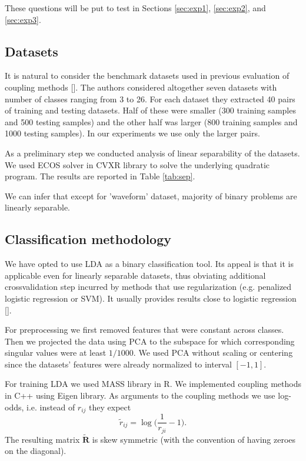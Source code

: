 \documentclass[twoside,11pt]{article}
\begin{document}
These questions will be put to test in Sections \ref{sec:exp1}, \ref{sec:exp2}, and \ref{sec:exp3}.

\subsection{Datasets}

It is natural to consider the benchmark datasets used in previous evaluation of coupling methods [\cite{wu2004probability}]. The authors considered altogether seven datasets with number of classes ranging from 3 to 26. For each dataset they extracted 40 pairs of training and testing datasets. Half of these were smaller (300 training samples and 500 testing samples) and the other half was larger (800 training samples and 1000 testing samples). In our experiments we use only the larger pairs. 

As a preliminary step we conducted analysis of linear separability of the datasets. We used ECOS solver in CVXR library to solve the underlying quadratic program. The results are reported in Table \ref{tab:sep}.



We can infer that except for 'waveform' dataset, majority of binary problems are linearly separable.

\subsection{Classification methodology}

We have opted to use LDA as a binary classification tool. Its appeal is that it is applicable even for linearly separable datasets, thus obviating additional crossvalidation step incurred by methods that use regularization (e.g. penalized logistic regression or SVM). It usually provides results close to logistic regression [\cite{james2013introduction}].

For preprocessing we first removed features that were constant across classes. Then we projected the data using PCA to the subspace for which corresponding singular values were at least $1/1000$. We used PCA without scaling or centering since the datasets' features were already normalized to interval $[-1,1]$. 

For training LDA we used MASS library in R. We implemented coupling methods in C++ using Eigen library. As arguments to the coupling methods we use log-odds, i.e. instead of $r_{ij}$ they expect
$$
\tilde r_{ij} = \log \biggl(\frac{1}{r_{ji}} - 1\biggr).
$$
The resulting matrix $\tilde{\boldsymbol{R}}$ is skew symmetric (with the convention of having zeroes on the diagonal).
\end{document}
